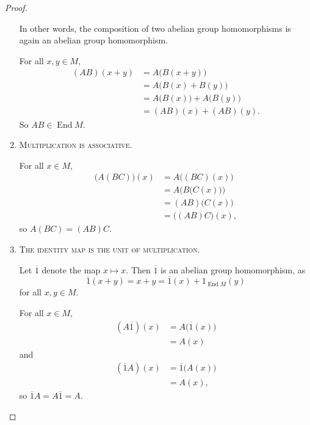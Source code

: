 \documentclass{article}
\newcommand*\End{\ensuremath{\operatorname{End}}}
\begin{document}
\begin{proof}
\begin{enumerate}
            In other words, the composition of two abelian group homomorphisms is again an abelian group homomorphism.

            For all $x, y \in M$,
            \begin{align*}
                (AB)(x+y)
                &=
                A\big(B(x+y)\big) \\
                &=
                A\big(B(x) + B(y)\big) \\
                &=
                A\big(B(x)\big) + A\big(B(y)\big) \\
                &=
                (AB)(x) + (AB)(y).
            \end{align*}
            So $AB \in \End M$.
        \item 
            \textsc{\color{Crimson} Multiplication is associative.}

            For all $x \in M$,
            \begin{align*}
                \big(A(BC)\big)(x)
                &= 
                A\big((BC)(x)\big) \\
                &=
                A\Big(B\big(C(x)\big)\Big) \\
                &=
                (AB)\big(C(x)\big) \\
                &=
                \big((AB)C\big)(x),
            \end{align*}
            so $A(BC) = (AB)C$.
        \item 
            \textsc{\color{Crimson} The identity map is the unit of multiplication.}

            Let $\overline1$ denote the map $x \mapsto x$.
            Then $\overline1$ is an abelian group homomorphism, as
            \[
                \overline1(x+y)
                =
                x+y
                =
                \overline1(x) + 1_{\End M}(y)
            \]
            for all $x,y \in M$.

            For all $x \in M$,
            \begin{align*}
                (A\overline1)(x)
                &=
                A\big(\overline1(x)\big) \\
                &=
                A(x)
            \end{align*}
            and
            \begin{align*}
                (\overline1A)(x)
                &=
                \overline1\big(A(x)\big) \\
                &=
                A(x),
            \end{align*}
            so $\overline1A = A\overline1 = A$.
    \end{enumerate}


\end{proof}
\end{document}
